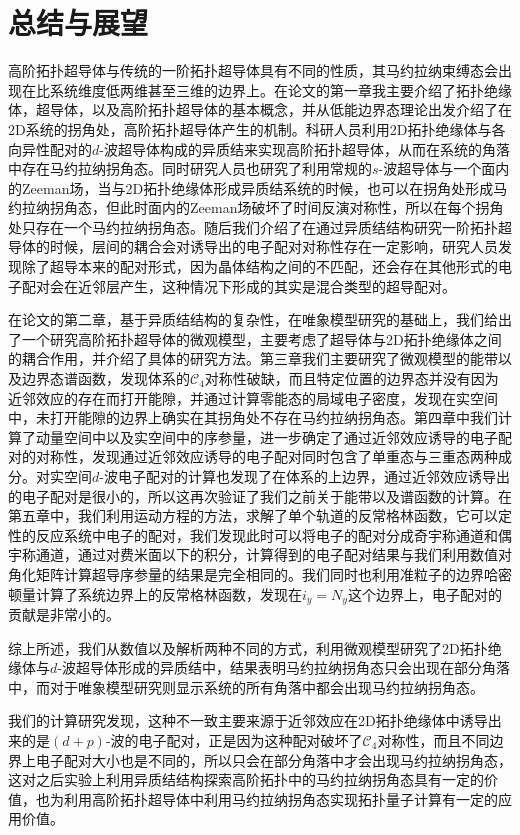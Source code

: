 \section{总结与展望}
高阶拓扑超导体与传统的一阶拓扑超导体具有不同的性质，其马约拉纳束缚态会出现在比系统维度低两维甚至三维的边界上。在论文的第一章我主要介绍了拓扑绝缘体，超导体，以及高阶拓扑超导体的基本概念，并从低能边界态理论出发介绍了在2D系统的拐角处，高阶拓扑超导体产生的机制。科研人员利用2D拓扑绝缘体与各向异性配对的$d$-波超导体构成的异质结来实现高阶拓扑超导体，从而在系统的角落中存在马约拉纳拐角态。同时研究人员也研究了利用常规的$s$-波超导体与一个面内的Zeeman场，当与2D拓扑绝缘体形成异质结系统的时候，也可以在拐角处形成马约拉纳拐角态，但此时面内的Zeeman场破坏了时间反演对称性，所以在每个拐角处只存在一个马约拉纳拐角态。随后我们介绍了在通过异质结结构研究一阶拓扑超导体的时候，层间的耦合会对诱导出的电子配对对称性存在一定影响，研究人员发现除了超导本来的配对形式，因为晶体结构之间的不匹配，还会存在其他形式的电子配对会在近邻层产生，这种情况下形成的其实是混合类型的超导配对。

在论文的第二章，基于异质结结构的复杂性，在唯象模型研究的基础上，我们给出了一个研究高阶拓扑超导体的微观模型，主要考虑了超导体与2D拓扑绝缘体之间的耦合作用，并介绍了具体的研究方法。第三章我们主要研究了微观模型的能带以及边界态谱函数，发现体系的$\mathcal{C}_4$对称性破缺，而且特定位置的边界态并没有因为近邻效应的存在而打开能隙，并通过计算零能态的局域电子密度，发现在实空间中，未打开能隙的边界上确实在其拐角处不存在马约拉纳拐角态。第四章中我们计算了动量空间中以及实空间中的序参量，进一步确定了通过近邻效应诱导的电子配对的对称性，发现通过近邻效应诱导的电子配对同时包含了单重态与三重态两种成分。对实空间$d$-波电子配对的计算也发现了在体系的上边界，通过近邻效应诱导出的电子配对是很小的，所以这再次验证了我们之前关于能带以及谱函数的计算。在第五章中，我们利用运动方程的方法，求解了单个轨道的反常格林函数，它可以定性的反应系统中电子的配对，我们发现此时可以将电子的配对分成奇宇称通道和偶宇称通道，通过对费米面以下的积分，计算得到的电子配对结果与我们利用数值对角化矩阵计算超导序参量的结果是完全相同的。我们同时也利用准粒子的边界哈密顿量计算了系统边界上的反常格林函数，发现在$i_y=N_y$这个边界上，电子配对的贡献是非常小的。

综上所述，我们从数值以及解析两种不同的方式，利用微观模型研究了2D拓扑绝缘体与$d$-波超导体形成的异质结中，结果表明马约拉纳拐角态只会出现在部分角落中，而对于唯象模型研究则显示系统的所有角落中都会出现马约拉纳拐角态。

我们的计算研究发现，这种不一致主要来源于近邻效应在2D拓扑绝缘体中诱导出来的是$(d+p)$-波的电子配对，正是因为这种配对破坏了$\mathcal{C}_4$对称性，而且不同边界上电子配对大小也是不同的，所以只会在部分角落中才会出现马约拉纳拐角态，这对之后实验上利用异质结结构探索高阶拓扑中的马约拉纳拐角态具有一定的价值，也为利用高阶拓扑超导体中利用马约拉纳拐角态实现拓扑量子计算有一定的应用价值。



